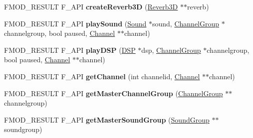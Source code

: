 \begin{DoxyCompactItemize}
\item 
\hypertarget{class_f_m_o_d_1_1_system_aedd7913fc01f33f89a399295dc4b0ea4}{F\+M\+O\+D\+\_\+\+R\+E\+S\+U\+L\+T F\+\_\+\+A\+P\+I {\bfseries create\+Reverb3\+D} (\hyperlink{class_f_m_o_d_1_1_reverb3_d}{Reverb3\+D} $\ast$$\ast$reverb)}\label{class_f_m_o_d_1_1_system_aedd7913fc01f33f89a399295dc4b0ea4}

\item 
\hypertarget{class_f_m_o_d_1_1_system_aa0eff9e71f48fd3710b5eba1a3b6d2b4}{F\+M\+O\+D\+\_\+\+R\+E\+S\+U\+L\+T F\+\_\+\+A\+P\+I {\bfseries play\+Sound} (\hyperlink{class_f_m_o_d_1_1_sound}{Sound} $\ast$sound, \hyperlink{class_f_m_o_d_1_1_channel_group}{Channel\+Group} $\ast$channelgroup, bool paused, \hyperlink{class_f_m_o_d_1_1_channel}{Channel} $\ast$$\ast$channel)}\label{class_f_m_o_d_1_1_system_aa0eff9e71f48fd3710b5eba1a3b6d2b4}

\item 
\hypertarget{class_f_m_o_d_1_1_system_a5a7f588f24305ff9cd888a191b9554a3}{F\+M\+O\+D\+\_\+\+R\+E\+S\+U\+L\+T F\+\_\+\+A\+P\+I {\bfseries play\+D\+S\+P} (\hyperlink{class_f_m_o_d_1_1_d_s_p}{D\+S\+P} $\ast$dsp, \hyperlink{class_f_m_o_d_1_1_channel_group}{Channel\+Group} $\ast$channelgroup, bool paused, \hyperlink{class_f_m_o_d_1_1_channel}{Channel} $\ast$$\ast$channel)}\label{class_f_m_o_d_1_1_system_a5a7f588f24305ff9cd888a191b9554a3}

\item 
\hypertarget{class_f_m_o_d_1_1_system_ada0bf180aafd95d6311fc6b743251299}{F\+M\+O\+D\+\_\+\+R\+E\+S\+U\+L\+T F\+\_\+\+A\+P\+I {\bfseries get\+Channel} (int channelid, \hyperlink{class_f_m_o_d_1_1_channel}{Channel} $\ast$$\ast$channel)}\label{class_f_m_o_d_1_1_system_ada0bf180aafd95d6311fc6b743251299}

\item 
\hypertarget{class_f_m_o_d_1_1_system_ac175dc5bc0e78ce2b52eddff65d16411}{F\+M\+O\+D\+\_\+\+R\+E\+S\+U\+L\+T F\+\_\+\+A\+P\+I {\bfseries get\+Master\+Channel\+Group} (\hyperlink{class_f_m_o_d_1_1_channel_group}{Channel\+Group} $\ast$$\ast$channelgroup)}\label{class_f_m_o_d_1_1_system_ac175dc5bc0e78ce2b52eddff65d16411}

\item 
\hypertarget{class_f_m_o_d_1_1_system_abb21546d80d099e01c58b3c7235b345d}{F\+M\+O\+D\+\_\+\+R\+E\+S\+U\+L\+T F\+\_\+\+A\+P\+I {\bfseries get\+Master\+Sound\+Group} (\hyperlink{class_f_m_o_d_1_1_sound_group}{Sound\+Group} $\ast$$\ast$soundgroup)}\label{class_f_m_o_d_1_1_system_abb21546d80d099e01c58b3c7235b345d}


\end{DoxyCompactItemize}
